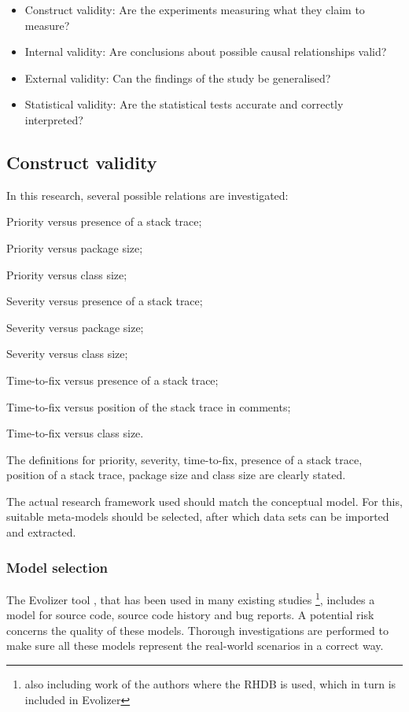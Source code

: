 \begin{itemize}
	\item Construct validity: Are the experiments measuring what they claim to measure?
	\item Internal validity: Are conclusions about possible causal relationships valid?
	\item External validity: Can the findings of the study be generalised?
	\item Statistical validity: Are the statistical tests accurate and correctly interpreted?
\end{itemize}

\subsection{Construct validity} %
\label{sub:construct_validity}
In this research, several possible relations are investigated:

\begin{itemize*}
	\item Priority versus presence of a stack trace;
	\item Priority versus package size;
	\item Priority versus class size;
	\item Severity versus presence of a stack trace;
	\item Severity versus package size;
	\item Severity versus class size;
	\item Time-to-fix versus presence of a stack trace;
	\item Time-to-fix versus position of the stack trace in comments;
	\item Time-to-fix versus class size.
\end{itemize*}

The definitions for priority, severity, time-to-fix, presence of a stack trace, position of a stack trace, package size and class size are clearly stated.

The actual research framework used should match the conceptual model. For this, suitable meta-models should be selected, after which data sets can be imported and extracted. 

\subsubsection{Model selection} %
The Evolizer tool \cite{Gall2009,Ghezzi2008,Ghezzi2010}, that has been used in many existing studies \cite{Fischer,Fischer2003,D'Ambros2006,D'Ambros2007,Fischer2004,Pinzger2005}\footnote{also including work of the authors where the RHDB is used, which in turn is included in Evolizer}, includes a model for source code, source code history and bug reports. A potential risk concerns the quality of these models. Thorough investigations are performed to make sure all these models represent the real-world scenarios in a correct way. 

